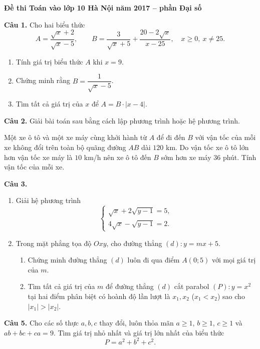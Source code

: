 \documentclass[12pt,a4paper]{article}
\begin{document}
\begin{center}
{\Large\bfseries Đề thi Toán vào lớp 10 Hà Nội năm 2017 -- phần Đại số}
\end{center}

\textbf{Câu 1.} Cho hai biểu thức
\[
A=\frac{\sqrt{x}+2}{\sqrt{x}-5},\qquad
B=\frac{3}{\sqrt{x}+5}+\frac{20-2\sqrt{x}}{x-25},
\quad x\ge0,\ x\ne25.
\]
\begin{enumerate}[label=\alph*)]
  \item Tính giá trị biểu thức $A$ khi $x=9$.
  \item Chứng minh rằng $B=\dfrac{1}{\sqrt{x}-5}$.
  \item Tìm tất cả giá trị của $x$ để $A=B\cdot|x-4|$.
\end{enumerate}

\textbf{Câu 2.} Giải bài toán sau bằng cách lập phương trình hoặc hệ phương trình.

Một xe ô tô và một xe máy cùng khởi hành từ $A$ để đi đến $B$ với vận tốc của mỗi xe không đổi trên toàn bộ quãng đường $AB$ dài $120$ km. Do vận tốc xe ô tô lớn hơn vận tốc xe máy là $10$ km/h nên xe ô tô đến $B$ sớm hơn xe máy $36$ phút. Tính vận tốc của mỗi xe.

\textbf{Câu 3.}
\begin{enumerate}[label=\alph*)]
  \item Giải hệ phương trình
  \[
  \begin{cases}
  \sqrt{x}+2\sqrt{y-1}=5,\\
  4\sqrt{x}-\sqrt{y-1}=2.
  \end{cases}
  \]
  \item Trong mặt phẳng tọa độ $Oxy$, cho đường thẳng $(d):y=mx+5$.
  \begin{enumerate}[label=(\alph*)]
    \item Chứng minh đường thẳng $(d)$ luôn đi qua điểm $A(0;5)$ với mọi giá trị của $m$.
    \item Tìm tất cả giá trị của $m$ để đường thẳng $(d)$ cắt parabol $(P):y=x^2$ tại hai điểm phân biệt có hoành độ lần lượt là $x_1,x_2$ ($x_1<x_2$) sao cho $|x_1|>|x_2|$.
  \end{enumerate}
\end{enumerate}

\textbf{Câu 5.} Cho các số thực $a,b,c$ thay đổi, luôn thỏa mãn $a\ge1$, $b\ge1$, $c\ge1$ và $ab+bc+ca=9$. Tìm giá trị nhỏ nhất và giá trị lớn nhất của biểu thức
\[
P=a^2+b^2+c^2.
\]
\end{document}

